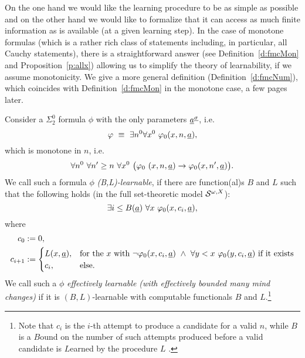 On the one hand we would like the learning procedure to be as simple as possible and on the other hand we would like to formalize that
it can access as much finite information as is available (at a given learning step). In the case of monotone formulas (which is a rather rich class of statements including, in 
particular, all Cauchy statements), there is a straightforward answer (see Definition~\ref{d:fmcMon} and Proposition~\ref{p:allx}) 
allowing us to simplify the theory of learnability, if we assume monotonicity.
We give a more general definition (Definition~\ref{d:fmcNum}), which coincides with Definition~\ref{d:fmcMon} in the monotone case, a few pages later.
\begin{dfn}\label{d:fmcMon}
Consider a $\Sigma^0_2$ formula $\phi$ with the only parameters $\underline a^{\underline \sigma}$, i.e.
\[\varphi\ \equiv\ \exists n^0 \forall x^0\ \varphi_0(x,n,\underline a),\]
which is monotone in $n$, i.e.
\[ 
\forall n^0\ \forall n'\ge n\ \forall x^0\ \big(  \varphi_0\ (x,n,\underline a) \rightarrow  \varphi_0(x,n',\underline a) \big).
\]
We call such a formula $\phi$ 
{\em (B,L)-learnable},
if there are function(al)s $B$ and $L$ such that the following holds 
(in the full set-theoretic model ${\cal S}^{\omega,X}$):
\[ 
\exists i\leq B(\tup a)\ \forall x\ \phi_0(x,c_i,\tup a),\] where
\begin{align*}
c_0&:=0,\\
c_{i+1}&:=
\begin{cases}
L(x, \tup a),&\text{for the $x$ with } \neg\phi_0(x,c_i,\tup a)\ \wedge\ \forall y<x\ \phi_0(y,c_i,\tup a) \text{ if it exists}\\
c_i,&\Telse.
\end{cases}
\end{align*}
We call such a $\phi$ 
{\em effectively learnable (with effectively bounded many mind changes)} 
if it is $(B,L)$-learnable with computable functionals $B$ and $L$.\footnote{Note that $c_i$ is the $i$-th attempt to produce a $c$andidate for a valid $n$, while $B$ is a $B$ound on the number of such attempts produced before a valid candidate is $L$earned by the procedure $L$ .}
\end{dfn}

